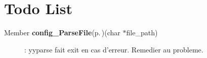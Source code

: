 \section{Todo List}\label{todo}
\label{todo__todo000001}
 \begin{description}
\item[Member {\bf config\_\-Parse\-File}{\rm (p.\,\pageref{config__parsing_8c_a6})}(char $\ast$file\_\-path) ]: yyparse fait exit en cas d'erreur. Remedier au probleme.\end{description}
